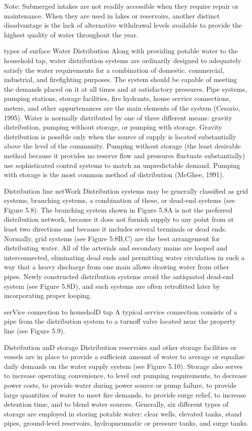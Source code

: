 \documentclass{article}
\begin{document}
Note: Submerged intakes are not readily accessible when they require
repair or maintenance. When they are used in lakes or reservoirs,
another distinct disadvantage is the lack of alternative withdrawal
levels available to provide the highest quality of water throughout the
year.

types of surface Water Distribution Along with providing potable water
to the household tap, water distribution systems are ordinarily designed
to adequately satisfy the water requirements for a combination of
domestic, commercial, industrial, and firefighting purposes. The system
should be capable of meeting the demands placed on it at all times and
at satisfactory pressures. Pipe systems, pumping stations, storage
facilities, fire hydrants, house service connections, meters, and other
appurtenances are the main elements of the system (Cesario, 1995). Water
is normally distributed by one of three different means: gravity
distribution, pumping without storage, or pumping with storage. Gravity
distribution is possible only when the source of supply is located
substantially above the level of the community. Pumping without storage
(the least desirable method because it provides no reserve flow and
pressures fluctuate substantially) use sophisticated control systems to
match an unpredictable demand. Pumping with storage is the most common
method of distribution (McGhee, 1991).

Distribution line netWork Distribution systems may be generally
classified as grid systems, branching systems, a combination of these,
or dead-end systems (see Figure 5.8). The branching system shown in
Figure 5.8A is not the preferred distribution network, because it does
not furnish supply to any point from at least two directions and because
it includes several terminals or dead ends. Normally, grid systems (see
Figure 5.8B,C) are the best arrangement for distributing water. All of
the arterials and secondary mains are looped and interconnected,
eliminating dead ends and permitting water circulation in such a way
that a heavy discharge from one main allows drawing water from other
pipes. Newly constructed distribution systems avoid the antiquated
dead-end system (see Figure 5.8D), and such systems are often
retrofitted later by incorporating proper looping.

serVice connection to householD tap A typical service connection
consists of a pipe from the distribution system to a turnoff valve
located near the property line (see Figure 5.9).

Distribution anD storage Distribution reservoirs and other storage
facilities or vessels are in place to provide a sufficient amount of
water to average or equalize daily demands on the water supply system
(see Figure 5.10). Storage also serves to increase operating
convenience, to level out pumping requirements, to decrease power costs,
to provide water during power source or pump failure, to provide large
quantities of water to meet fire demands, to provide surge relief, to
increase detention time, and to blend water sources. Generally, six
different types of storage are employed in storing potable water: clear
wells, elevated tanks, stand pipes, ground-level reservoirs,
hydropneumatic or pressure tanks, and surge tanks.
\end{document}
